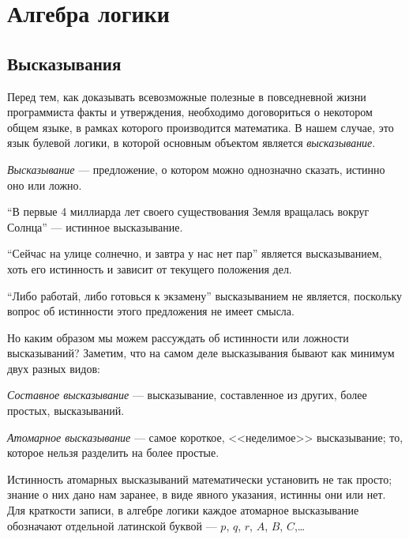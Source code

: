 \chapter{Алгебра логики}

\section{Высказывания}

Перед тем, как доказывать всевозможные полезные в повседневной жизни
программиста факты и утверждения, необходимо договориться о некотором общем
языке, в рамках которого производится математика. В нашем случае, это язык
булевой логики, в которой основным объектом является \textit{высказывание}.

\begin{defn}
  \textit{Высказывание} --- предложение, о котором можно однозначно сказать,
  истинно оно или ложно.
\end{defn}

\begin{ex}
  ``В первые 4 миллиарда лет своего существования Земля вращалась вокруг
  Солнца'' --- истинное высказывание.
\end{ex}
\begin{ex}\label{sun}
  ``Сейчас на улице солнечно, и завтра у нас нет пар'' является высказыванием,
  хоть его истинность и зависит от текущего положения дел.
\end{ex}
\begin{ex}
  ``Либо работай, либо готовься к экзамену'' высказыванием не является,
  поскольку вопрос об истинности этого предложения не имеет смысла.
\end{ex}

Но каким образом мы можем рассуждать об истинности или ложности высказываний?
Заметим, что на самом деле высказывания бывают как минимум двух разных видов:

\begin{defn}
  \textit{Составное высказывание} --- высказывание, составленное из других,
  более простых, высказываний.
\end{defn}
\begin{defn}
  \textit{Атомарное высказывание} --- самое короткое, <<неделимое>>
  высказывание; то, которое нельзя разделить на более простые.
\end{defn}

Истинность атомарных высказываний математически установить не так просто; знание
о них дано нам заранее, в виде явного указания, истинны они или нет. Для
краткости записи, в алгебре логики каждое атомарное высказывание обозначают
отдельной латинской буквой --- $p$, $q$, $r$, $A$, $B$, $C$,\dots

